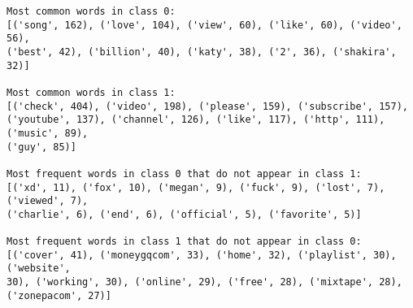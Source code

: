 \documentclass[11pt]{article}
\begin{document}
    \begin{Verbatim}[commandchars=\\\{\}]
Most common words in class 0:
[('song', 162), ('love', 104), ('view', 60), ('like', 60), ('video', 56),
('best', 42), ('billion', 40), ('katy', 38), ('2', 36), ('shakira', 32)]

Most common words in class 1:
[('check', 404), ('video', 198), ('please', 159), ('subscribe', 157),
('youtube', 137), ('channel', 126), ('like', 117), ('http', 111), ('music', 89),
('guy', 85)]

Most frequent words in class 0 that do not appear in class 1:
[('xd', 11), ('fox', 10), ('megan', 9), ('fuck', 9), ('lost', 7), ('viewed', 7),
('charlie', 6), ('end', 6), ('official', 5), ('favorite', 5)]

Most frequent words in class 1 that do not appear in class 0:
[('cover', 41), ('moneygqcom', 33), ('home', 32), ('playlist', 30), ('website',
30), ('working', 30), ('online', 29), ('free', 28), ('mixtape', 28),
('zonepacom', 27)]
    \end{Verbatim}
\end{document}
